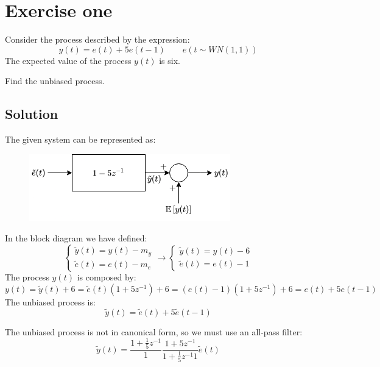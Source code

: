 \section{Exercise one}

Consider the process described by the expression: 
\[y(t)=e(t)+5e(t-1)\qquad e(t\sim WN(1,1))\]
The expected value of the process $y(t)$ is six. 

Find the unbiased process. 

\subsection{Solution}
The given system can be represented as: 
\begin{figure}[H]
    \centering
    \includegraphics[width=0.5\linewidth]{images/bias.png}
\end{figure}
In the block diagram we have defined: 
\[\begin{cases}
    \tilde{y}(t)=y(t)-m_y \\
    \tilde{e}(t)=e(t)-m_e 
\end{cases}\rightarrow \begin{cases}
    \tilde{y}(t)=y(t)-6 \\
    \tilde{e}(t)=e(t)-1 
\end{cases}\]
The process $y(t)$ is composed by: 
\[y(t)=\tilde{y}(t)+6=\tilde{e}(t)\left( 1+5z^{-1} \right)+6=\left(e(t)-1\right)\left( 1+5z^{-1} \right)+6=e(t)+5e(t-1)\]
The unbiased process is: 
\[\tilde{y}(t)=\tilde{e}(t)+5\tilde{e}(t-1)\]

The unbiased process is not in canonical form, so we must use an all-pass filter: 
\[\tilde{y}(t)=\dfrac{1+\frac{1}{5}z^{-1}}{1}\dfrac{1+5z^{-1}}{1+\frac{1}{5}z^{-1}1}\tilde{e}(t)\]











